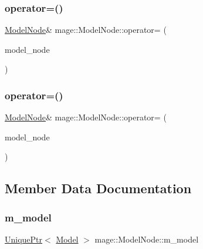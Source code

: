 \subsubsection{\texorpdfstring{operator=()}{operator=()}\hspace{0.1cm}{\footnotesize\ttfamily [1/2]}}
{\footnotesize\ttfamily \hyperlink{classmage_1_1_model_node}{Model\+Node}\& mage\+::\+Model\+Node\+::operator= (\begin{DoxyParamCaption}\item[{const \hyperlink{classmage_1_1_model_node}{Model\+Node} \&}]{model\+\_\+node }\end{DoxyParamCaption})\hspace{0.3cm}{\ttfamily [delete]}}

\hypertarget{classmage_1_1_model_node_ad39321f4d392aa4e28169b8d7a08af68}{}\label{classmage_1_1_model_node_ad39321f4d392aa4e28169b8d7a08af68} 
\subsubsection{\texorpdfstring{operator=()}{operator=()}\hspace{0.1cm}{\footnotesize\ttfamily [2/2]}}
{\footnotesize\ttfamily \hyperlink{classmage_1_1_model_node}{Model\+Node}\& mage\+::\+Model\+Node\+::operator= (\begin{DoxyParamCaption}\item[{\hyperlink{classmage_1_1_model_node}{Model\+Node} \&\&}]{model\+\_\+node }\end{DoxyParamCaption})\hspace{0.3cm}{\ttfamily [delete]}}



\subsection{Member Data Documentation}
\hypertarget{classmage_1_1_model_node_a784faf19f736a1c74808321ed0e52d36}{}\label{classmage_1_1_model_node_a784faf19f736a1c74808321ed0e52d36} 
\subsubsection{\texorpdfstring{m\+\_\+model}{m\_model}}
{\footnotesize\ttfamily \hyperlink{namespacemage_a8c307fbcc33bce9b7f2aa4c26c3b95cf}{Unique\+Ptr}$<$ \hyperlink{classmage_1_1_model}{Model} $>$ mage\+::\+Model\+Node\+::m\+\_\+model\hspace{0.3cm}{\ttfamily [private]}}

